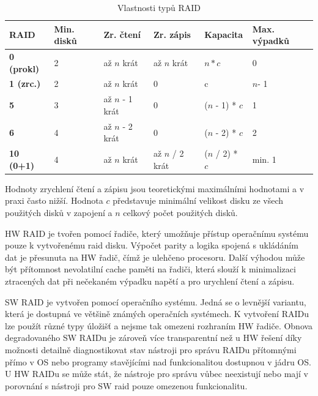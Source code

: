 \documentclass[czech,DP]{thesiskiv}
\begin{document}
\begin{table}[]
\centering
\caption{Vlastnosti typů RAID}
\label{typyraid}
\begin{adjustbox}{max width=\textwidth}
\begin{threeparttable}
\begin{tabular}{|l|l|l|l|l|l|}
\hline
\textbf{RAID}               & \textbf{Min. disků} & \textbf{Zr. čtení} & \textbf{Zr. zápis} & \textbf{Kapacita} & \textbf{Max. výpadků} \\ \hline
\textbf{0 (prokl)}     & 2                   & až $n$ krát               & až $n$ krát                   & $n * c$             & 0                     \\ \hline
\textbf{1 (zrc.)}      & 2                   & až $n$ krát                   & 0                        & c                 & $n$- 1                 \\ \hline
\textbf{5}         & 3                   & až $n$ - 1 krát               & 0                        & ($n$ - 1) * $c$       & 1                     \\ \hline
\textbf{6} & 4                   & až $n$ - 2 krát               & 0                        & ($n$ - 2) * $c$       & 2                     \\ \hline
\textbf{10 (0+1)}           & 4                   & až $n$ krát                   & až $n$ / 2 krát               & ($n$ / 2) * $c$       & min. 1                \\ \hline
\end{tabular}
\begin{tablenotes}
\small
\item
Hodnoty zrychlení čtení a zápisu jsou teoretickými maximálními hodnotami a v praxi často nižší. Hodnota $c$ představuje minimální velikost disku ze všech použitých disků v zapojení a $n$ celkový počet použitých disků.
\end{tablenotes}
\end{threeparttable}
\end{adjustbox}
\end{table}

HW RAID je tvořen pomocí řadiče, který umožňuje přístup operačnímu systému pouze k vytvořenému raid disku. Výpočet parity a logika spojená s ukládáním dat je přesunuta na HW řadič, čímž je ulehčeno procesoru. Další výhodou může být přítomnost nevolatilní cache paměti na řadiči, která slouží k minimalizaci ztracených dat při nečekaném výpadku napětí a pro urychlení čtení a zápisu.

SW RAID je vytvořen pomocí operačního systému. Jedná se o levnější variantu, která je dostupná ve většině známých operačních systémech. K vytvoření RAIDu lze použít různé typy úložišť a nejsme tak omezeni rozhraním HW řadiče. Obnova degradovaného SW RAIDu je zároveň více transparentní než u HW řešení díky možnosti detailně diagnostikovat stav nástroji pro správu RAIDu přítomnými přímo v OS nebo programy stavějícími nad funkcionalitou dostupnou v jádru OS. U HW RAIDu se může stát, že nástroje pro správu vůbec neexistují nebo mají v porovnání s nástroji pro SW raid pouze omezenou funkcionalitu.
\end{document}

